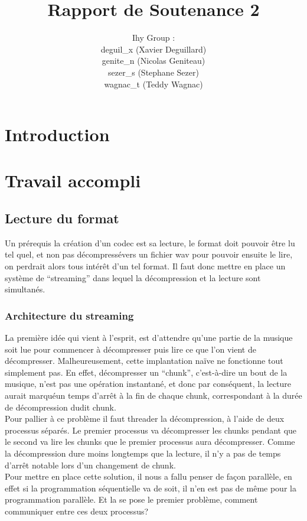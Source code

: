 \documentclass[a4paper,12pt]{article}
\title{Rapport de Soutenance 2}
\author{
Ihy Group : \\
deguil\_x (Xavier Deguillard)\\
genite\_n (Nicolas Geniteau)\\
sezer\_s (Stephane Sezer)\\
wagnac\_t (Teddy Wagnac)
}
\begin{document}
\maketitle

\newpage

\section*{Introduction}

\newpage

\tableofcontents

\newpage

\section{Travail accompli}
	\subsection{Lecture du format}
Un pr\'erequis la cr\'eation d'un codec est sa lecture, le format doit
pouvoir \^etre lu tel quel, et non pas d\'ecompress\'evers un fichier wav pour
pouvoir ensuite le lire, on
perdrait alors tous int\'er\^et d'un tel format. Il faut donc mettre en place un
syst\`eme de ``streaming'' dans lequel la d\'ecompression et la lecture sont
simultan\'es.
		\subsubsection{Architecture du streaming}
La premi\`ere id\'ee qui vient à l'esprit, est d'attendre qu'une partie de la
musique soit lue pour commencer à d\'ecompresser puis lire ce que l'on vient de
d\'ecompresser. Malheureusement, cette implantation naïve ne fonctionne tout
simplement pas. En effet, d\'ecompresser un ``chunk'', c'est-à-dire un bout de la
musique, n'est pas une op\'eration instantan\'e, et donc par cons\'equent, la lecture
aurait marqu\'eun temps d'arr\^et à la fin de chaque chunk, correspondant à la
dur\'ee de d\'ecompression dudit chunk.\\
Pour pallier à ce probl\`eme il faut threader la d\'ecompression, à l'aide de deux
processus s\'epar\'es. Le premier processus va d\'ecompresser les chunks pendant que
le second va lire les chunks que le premier processus aura d\'ecompresser. Comme
la d\'ecompression dure moins longtemps que la lecture, il n'y a pas de temps
d'arr\^et notable lors d'un changement de chunk.\\
Pour mettre en place cette solution, il nous a fallu penser de façon parall\`ele,
en effet si la programmation s\'equentielle va de soit, il n'en est pas de m\^eme
pour la programmation parall\`ele. Et la se pose le premier probl\`eme, comment
communiquer entre ces deux processus?\\
\end{document}
